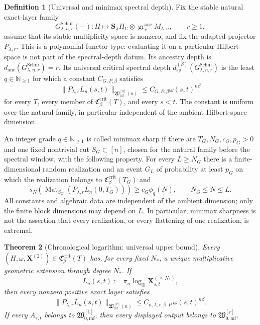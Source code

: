 \documentclass[10pt,reqno]{amsart}
\theoremstyle{plain}
\newtheorem{theorem}{Theorem}[section]
\theoremstyle{definition}
\newtheorem{definition}[theorem]{Definition}
\theoremstyle{remark}
\begin{document}
\begin{definition}[Universal and minimax spectral depth]
\label{cc:gen-definition-minimax-depth}
Fix the stable natural exact-layer family
\[
 G^{\mathrm{Schur}}_{\lambda,n,r}(-):
 H\longmapsto
 {\mathbf S}_{\lambda}H_{\mathbb C}\otimes
 \operatorname{gr}^{\mathrm{anc}}_rM_{\lambda,n},
 \qquad r\geq1,
\]
assume that its stable multiplicity space is nonzero, and fix the
adapted projector \(P_{\lambda,r}\).  This is a polynomial-functor
type: evaluating it on a particular Hilbert space is not part of the
spectral-depth datum.  Its ancestry depth is
\(d_{\mathrm{anc}}(G^{\mathrm{Schur}}_{\lambda,n,r})=r\).  Its
universal critical spectral depth
\(d_{\mathrm{sp}}^{(\beta)}(G^{\mathrm{Schur}}_{\lambda,n,r})\) is the
least \(q\in\mathbb N_{\geq1}\) for which a constant
\(C_{G,P,\beta}\) satisfies
\begin{equation}
 \|P_{\lambda,r}L_n(s,t)\|_{\mathfrak W_{\mathrm{mf}}^{[q]}(n)}
 \leq C_{G,P,\beta}\omega(s,t)^{n\beta}
 \label{cc:gen-universal-grade}
\end{equation}
for every \(T\), every member of
\(\mathfrak C_{\beta}^{\mathrm{crit}}(T)\), and every \(s<t\).
The constant is uniform over the natural family, in particular
independent of the ambient Hilbert-space dimension.

An integer grade \(q\in\mathbb N_{\geq1}\) is called minimax sharp if
there are \(T_G,N_G,c_G,p_G>0\) and one fixed nontrivial cut
\(S_G\subset[n]\), chosen for the natural family before the spectral
window, with the following property.  For every \(L\geq N_G\) there is
a finite-dimensional random realization and an event \(G_L\) of
probability at least \(p_G\) on
which the realization belongs to
\(\mathfrak C_{\beta}^{\mathrm{crit}}(T_G)\) and
\begin{equation}
 s_N\!\left(
 \operatorname{Mat}_{S_G}
 (P_{\lambda,r}L_n(0,T_G))
 \right)
 \geq c_G\phi_q(N),
 \qquad N_G\leq N\leq L.
 \label{cc:gen-minimax-lower}
\end{equation}
All constants and algebraic data are independent of the ambient
dimension; only the finite block dimensions may depend on \(L\).  In particular,
minimax sharpness is not the assertion that every realization, or every
flattening of one realization, is extremal.
\end{definition}

\begin{theorem}[Chronological logarithm: universal upper bound]
\label{cc:gen-theorem-chronological-upper}
Every \((H,\omega,{\mathbf X}^{(2)})\in
\mathfrak C_{\beta}^{\mathrm{crit}}(T)\) has, for every fixed
\(N_*\), a unique multiplicative geometric extension through degree
\(N_*\).  If
\[
 L_n(s,t):=
 \pi_n\log_\otimes{\mathbf X}^{(\leq N_*)}_{s,t},
\]
then every nonzero positive exact layer satisfies
\begin{equation}
 \|P_{\lambda,r}L_n(s,t)\|_
 {\mathfrak W_{\mathrm{mf}}^{[r]}(n)}
 \leq C_{n,\lambda,r,\beta,P}\,
 \omega(s,t)^{n\beta}.
 \label{cc:gen-chronological-upper}
\end{equation}
If every \(A_{s,t}\) belongs to
\(\mathfrak W_{0,\mathrm{mf}}^{[1]}\), then every displayed output
belongs to \(\mathfrak W_{0,\mathrm{mf}}^{[r]}\).
\end{theorem}
\end{document}
